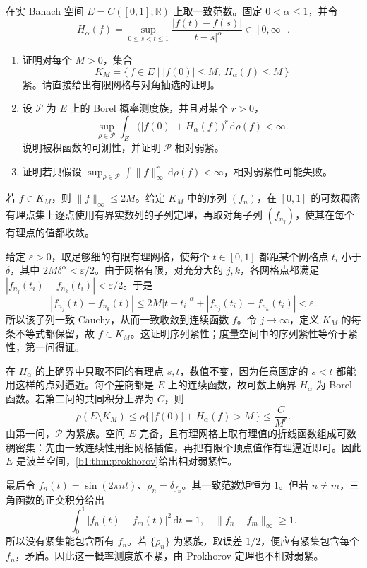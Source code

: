 \begin{optionalexercise}\label{b1:ex:12-holder-paths}
在实 Banach 空间 \(E=C([0,1];\mathbb R)\) 上取一致范数。固定 \(0<\alpha\le1\)，并令
\[
 H_\alpha(f)=\sup_{0\le s<t\le1}\frac{|f(t)-f(s)|}{|t-s|^\alpha}\in[0,\infty].
\]
\begin{enumerate}
\item\label{b1:item:12-holder-compact}
证明对每个 \(M>0\)，集合
\[
 K_M=\{\,f\in E\mid |f(0)|\le M,\ H_\alpha(f)\le M\,\}
\]
紧。请直接给出有限网格与对角抽选的证明。
\item\label{b1:item:12-holder-measures}
设 \(\mathcal P\) 为 \(E\) 上的 Borel 概率测度族，并且对某个 \(r>0\)，
\[
 \sup_{\rho\in\mathcal P}\int_E\bigl(|f(0)|+H_\alpha(f)\bigr)^r\,\mathrm d\rho(f)<\infty.
\]
说明被积函数的可测性，并证明 \(\mathcal P\) 相对弱紧。
\item\label{b1:item:12-holder-insufficient}
证明若只假设 \(\sup_{\rho\in\mathcal P}\int\|f\|_\infty^r\,\mathrm d\rho(f)<\infty\)，相对弱紧性可能失败。
\end{enumerate}
\end{optionalexercise}
\begin{solution}
若 \(f\in K_M\)，则 \(\|f\|_\infty\le2M\)。给定 \(K_M\) 中的序列 \((f_n)\)，在 \([0,1]\) 的可数稠密有理点集上逐点使用有界实数列的子列定理，再取对角子列 \((f_{n_j})\)，使其在每个有理点的值都收敛。

给定 \(\varepsilon>0\)，取足够细的有限有理网格，使每个 \(t\in[0,1]\) 都距某个网格点 \(t_i\) 小于 \(\delta\)，其中 \(2M\delta^\alpha<\varepsilon/2\)。由于网格有限，对充分大的 \(j,k\)，各网格点都满足 \(|f_{n_j}(t_i)-f_{n_k}(t_i)|<\varepsilon/2\)。于是
\[
 |f_{n_j}(t)-f_{n_k}(t)|
 \le2M|t-t_i|^\alpha+|f_{n_j}(t_i)-f_{n_k}(t_i)|<\varepsilon.
\]
所以该子列一致 Cauchy，从而一致收敛到连续函数 \(f\)。令 \(j\to\infty\)，定义 \(K_M\) 的每条不等式都保留，故 \(f\in K_M\)。这证明序列紧性；度量空间中的序列紧性等价于紧性，第一问得证。

在 \(H_\alpha\) 的上确界中只取不同的有理点 \(s,t\)，数值不变，因为任意固定的 \(s<t\) 都能用这样的点对逼近。每个差商都是 \(E\) 上的连续函数，故可数上确界 \(H_\alpha\) 为 Borel 函数。若第二问的共同积分上界为 \(C\)，则
\[
 \rho(E\setminus K_M)
 \le\rho\{\,|f(0)|+H_\alpha(f)>M\,\}\le\frac C{M^r}.
\]
由第一问，\(\mathcal P\) 为紧族。空间 \(E\) 完备，且有理网格上取有理值的折线函数组成可数稠密集：先由一致连续性用细网格插值，再把有限个顶点值作有理逼近即可。因此 \(E\) 是波兰空间，\cref{b1:thm:prokhorov}给出相对弱紧性。

最后令 \(f_n(t)=\sin(2\pi nt)\)、\(\rho_n=\delta_{f_n}\)。其一致范数矩恒为 \(1\)。但若 \(n\ne m\)，三角函数的正交积分给出
\[
 \int_0^1|f_n(t)-f_m(t)|^2\,\mathrm dt=1,
 \quad\|f_n-f_m\|_\infty\ge1.
\]
所以没有紧集能包含所有 \(f_n\)。若 \(\{\rho_n\}\) 为紧族，取误差 \(1/2\)，便应有紧集包含每个 \(f_n\)，矛盾。因此这一概率测度族不紧，由 Prokhorov 定理也不相对弱紧。
\end{solution}

